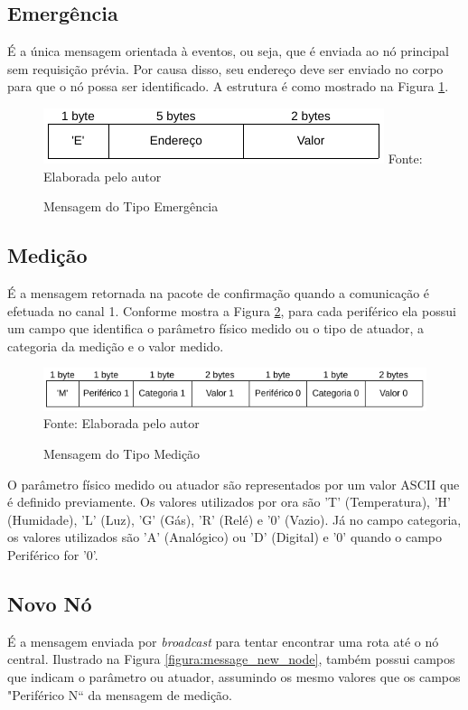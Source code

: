 {\subsection{Emergência}
É a única mensagem orientada à eventos, ou seja, que é enviada ao nó principal sem requisição prévia. Por
causa disso, seu endereço deve ser enviado no corpo para que o nó possa ser identificado. A estrutura é como
mostrado na Figura \ref{figura:message_emergency}.

\begin{figure}[h!]
	\caption{Mensagem do Tipo Emergência}
	\centering
	\includegraphics[scale=0.5]{../images/mensagem_emergencia.png}
	\hspace{\linewidth}
	Fonte: Elaborada pelo autor
	\label{figura:message_emergency}
\end{figure}

\subsection{Medição}
É a mensagem retornada na pacote de confirmação quando a comunicação é efetuada no canal 1. Conforme mostra
a Figura \ref{figura:message_measurement}, para cada periférico ela possui um campo que identifica o parâmetro
físico medido ou o tipo de atuador, a categoria da medição e o valor medido.

\begin{figure}[h!]
	\caption{Mensagem do Tipo Medição}
	\centering
	\includegraphics[scale=0.5]{../images/mensagem_medida.png}
	\hspace{\linewidth}
	Fonte: Elaborada pelo autor
	\label{figura:message_measurement}
\end{figure}

O parâmetro físico medido ou atuador são representados por um valor ASCII que é definido previamente. Os valores utilizados
por ora são 'T' (Temperatura), 'H' (Humidade), 'L' (Luz), 'G' (Gás), 'R' (Relé) e '0' (Vazio). Já no campo categoria, os
valores utilizados são 'A' (Analógico) ou 'D' (Digital) e '0' quando o campo Periférico for '0'.

\subsection{Novo Nó}
É a mensagem enviada por \textit{broadcast} para tentar encontrar uma rota até o nó central. Ilustrado na
Figura \ref{figura:message_new_node}, também possui campos que indicam o parâmetro ou atuador, assumindo os
mesmo valores que os campos "Periférico N`` da mensagem de medição.

}
